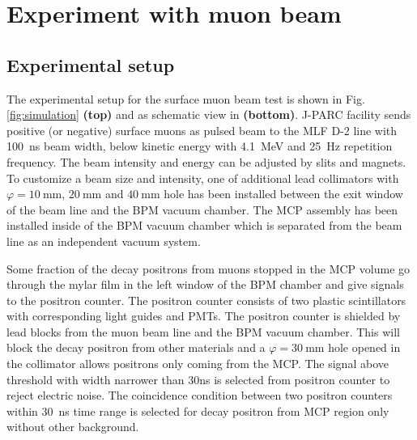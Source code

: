 \documentclass[preprint,3p,twocolumn]{elsarticle}
\begin{document}
\section{Experiment with muon beam}

\subsection{Experimental setup} 

The experimental setup for the surface muon beam test is shown in Fig.\ref{fig:simulation} {\bf (top)} and as schematic view in {\bf (bottom)}.
J-PARC facility sends positive (or negative) surface muons as pulsed beam to the MLF D-2 line with \SI{100}{\nano\s} beam width, below kinetic energy with \SI{4.1}{\MeV} and \SI{25}{\hertz} repetition frequency.
The beam intensity and energy can be adjusted by slits and magnets.
To customize a beam size and intensity, one of additional lead collimators with $\varphi=\SI{10}{\mm}$, $\SI{20}{\mm}$ and $\SI{40}{\mm}$ hole has been installed between the exit window of the beam line and the BPM vacuum chamber.
The MCP assembly has been installed inside of the BPM vacuum chamber which is separated from the beam line as an independent vacuum system.

Some fraction of the decay positrons from muons stopped in the MCP volume go through the mylar film in the left window of the BPM chamber and give signals to the positron counter. 
The positron counter consists of two plastic scintillators with corresponding light guides and PMTs. %
The positron counter is shielded by lead blocks from the muon beam line and the BPM vacuum chamber. This will block the decay positron from other materials and a $\varphi=\SI{30}{\mm}$ hole opened in the collimator allows positrons only coming from the MCP.
The signal above threshold with width narrower than 30ns is selected from positron counter to reject electric noise. 
The coincidence condition between two positron counters within \SI{30}{\ns} time range is selected for decay positron from MCP region only without other background.
\end{document}
